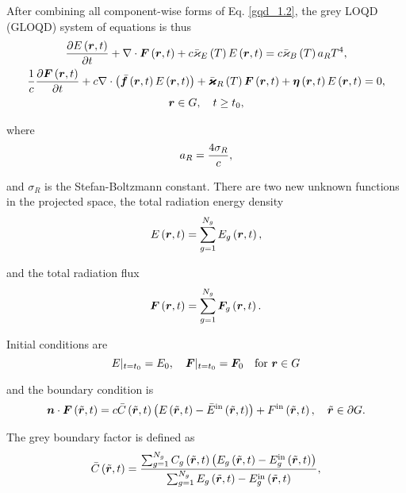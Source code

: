 	After combining all component-wise forms of Eq. \eqref{gqd_1.2}, the grey LOQD (GLOQD) system of equations is thus
	\begin{subequations}
		\begin{gather}
			\frac{\partial E\left(\bm{r},t\right)}{\partial t} + \nabla\cdot\bm{F}\left(\bm{r},t\right) + c\bar{\varkappa}_{E}\left( T\right)E\left(\bm{r},t\right) = c\bar{\varkappa}_{B}\left( T\right)a_R T^4, \label{gqd_1} \\
			\frac{1}{c}\frac{\partial \bm{F}\left(\bm{r},t\right)}{\partial t} + c\nabla\cdot\left(\bar{\bm{f}}\left(\bm{r},t\right)E\left(\bm{r},t\right)\right) + \bar{\bm{\varkappa}}_{R}\left( T\right)\bm{F}\left(\bm{r},t\right) + \bm{\eta}\left(\bm{r},t\right)E\left(\bm{r},t\right)= 0, \label{gqd_2}\\
			\bm{r} \in G, \quad t\geq t_0 , \nonumber
		\end{gather}
		\label{gqd_sys}
	\end{subequations}
	
	where
	\begin{equation}
		a_R = \frac{4 \sigma_R}{c},
	\end{equation}
	
	and $\sigma_R$ is the Stefan-Boltzmann constant. There are two new unknown functions in the projected space, the total radiation energy density
	\begin{equation}
		E\left(\bm{r},t\right) = \sum_{g=1}^{N_g}E_g\left(\bm{r},t\right),
	\end{equation}
	
	and the total radiation flux
	\begin{equation}
		\bm{F}\left(\bm{r},t\right) = \sum_{g=1}^{N_g}\bm{F}_g\left(\bm{r},t\right).
	\end{equation}
	
	Initial conditions are
	\begin{equation}
		E|_{t=t_0} = E_{0}, \quad \bm{F}|_{t=t_0} = \bm{F}_{0} \quad \text{for } \bm{r} \in G
	\end{equation}
	
	and the boundary condition is
	\begin{equation}
		\bm{n}\cdot\bm{F}\left(\tilde{\bm{r}},t\right) = c\bar{C}\left(\tilde{\bm{r}},t\right)\left(E\left(\tilde{\bm{r}},t\right) - \bar{E}^{\text{in}}\left(\tilde{\bm{r}},t\right)\right) + F^{\text{in}}\left(\tilde{\bm{r}},t\right), \quad \tilde{\bm{r}} \in\partial G.
	\end{equation}
	
	The grey boundary factor is defined as
	\begin{equation}
		\bar{C}\left(\tilde{\bm{r}},t\right) = \frac{ \sum_{g=1}^{N_g}C_g\left(\tilde{\bm{r}},t\right)\left(E_g\left(\tilde{\bm{r}},t\right) - E_g^{\text{in}}\left(\tilde{\bm{r}},t\right)\right) }{ \sum_{g=1}^{N_g}E_g\left(\tilde{\bm{r}},t\right) - E_g^{\text{in}}\left(\tilde{\bm{r}},t\right) },
	\end{equation}
	
